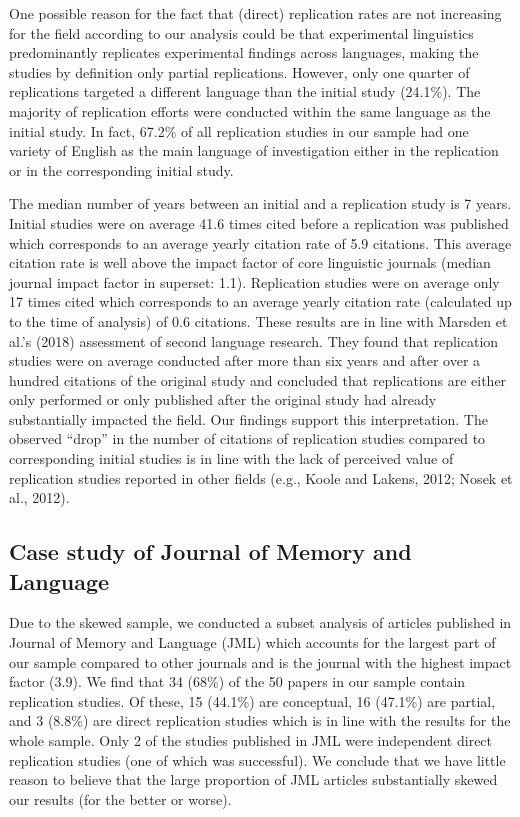 \documentclass[]{elsarticle} %
\begin{document}
One possible reason for the fact that (direct) replication rates are not increasing for the field according to our analysis could be that experimental linguistics predominantly replicates experimental findings across languages, making the studies by definition only partial replications.
However, only one quarter of replications targeted a different language than the initial study (24.1\%).
The majority of replication efforts were conducted within the same language as the initial study.
In fact, 67.2\% of all replication studies in our sample had one variety of English as the main language of investigation either in the replication or in the corresponding initial study.

The median number of years between an initial and a replication study is 7 years.
Initial studies were on average 41.6 times cited before a replication was published which corresponds to an average yearly citation rate of 5.9 citations.
This average citation rate is well above the impact factor of core linguistic journals (median journal impact factor in superset: 1.1).
Replication studies were on average only 17 times cited which corresponds to an average yearly citation rate (calculated up to the time of analysis) of 0.6 citations. These results are in line with Marsden et al.'s (2018) assessment of second language research. They found that replication studies were on average conducted after more than six years and after over a hundred citations of the original study and concluded that replications are either only performed or only published after the original study had already substantially impacted the field. Our findings support this interpretation.
The observed ``drop'' in the number of citations of replication studies compared to corresponding initial studies is in line with the lack of perceived value of replication studies reported in other fields (e.g., Koole and Lakens, 2012; Nosek et al., 2012).

\hypertarget{case-study-of-journal-of-memory-and-language}{%
\subsection{Case study of Journal of Memory and Language}\label{case-study-of-journal-of-memory-and-language}}

Due to the skewed sample, we conducted a subset analysis of articles published in Journal of Memory and Language (JML) which accounts for the largest part of our sample compared to other journals and is the journal with the highest impact factor (3.9). We find that 34 (68\%) of the 50 papers in our sample contain replication studies. Of these, 15 (44.1\%) are conceptual, 16 (47.1\%) are partial, and 3 (8.8\%) are direct replication studies which is in line with the results for the whole sample. Only 2 of the studies published in JML were independent direct replication studies (one of which was successful). We conclude that we have little reason to believe that the large proportion of JML articles substantially skewed our results (for the better or worse).
\end{document}
